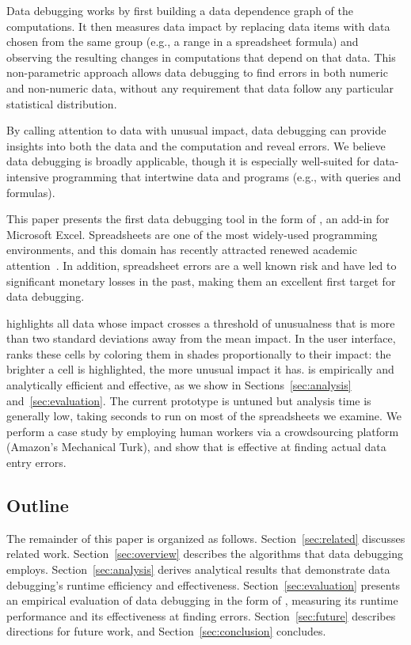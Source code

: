 Data debugging works by first building a data dependence graph of the
computations. It then measures data impact by replacing data items
with data chosen from the same group (e.g., a range in a spreadsheet
formula) and observing the resulting changes in computations that
depend on that data. This non-parametric approach allows data
debugging to find errors in both numeric and non-numeric data, without
any requirement that data follow any particular statistical
distribution.

By calling attention to data with unusual impact, data debugging can
provide insights into both the data and the computation and reveal
errors. We believe data debugging is broadly applicable, though it is
especially well-suited for data-intensive programming that intertwine
data and programs (e.g., with queries and formulas).

This paper presents the first data debugging tool in the form
of \checkcell{}, an add-in for Microsoft Excel. Spreadsheets are one
of the most widely-used programming environments, and this domain has
recently attracted renewed academic
attention~\cite{DBLP:conf/popl/Gulwani11,DBLP:conf/pldi/HarrisG11,Singh:2012:LSS:2212351.2212356}.
In addition, spreadsheet errors are a well known risk and have led to
significant monetary losses in the past, making them an excellent
first target for data debugging.

\checkcell{} highlights all data whose
impact crosses a threshold of unusualness that is more than two standard deviations away from the mean impact.  In the user interface, \checkcell{} ranks these cells by coloring them in
shades proportionally to their impact: the brighter a cell is
highlighted, the more unusual impact it has.
\checkcell{} is empirically and analytically efficient and effective, as we show in Sections~\ref{sec:analysis} and~\ref{sec:evaluation}. The current prototype is untuned but
analysis time is generally low, taking seconds to run on most of the
spreadsheets we examine. We perform a case study by employing human
workers via a crowdsourcing platform (Amazon's Mechanical Turk), and
show that \checkcell{} is effective at finding actual data entry
errors.

\subsection*{Outline}

The remainder of this paper is organized as
follows. Section~\ref{sec:related} discusses related
work. Section~\ref{sec:overview} describes the algorithms that data
debugging employs. Section~\ref{sec:analysis} derives analytical
results that demonstrate data debugging's runtime efficiency and
effectiveness. Section~\ref{sec:evaluation} presents an empirical
evaluation of data debugging in the form of \checkcell{}, measuring
its runtime performance and its effectiveness at finding
errors. Section~\ref{sec:future} describes directions for future work,
and Section~\ref{sec:conclusion} concludes.

